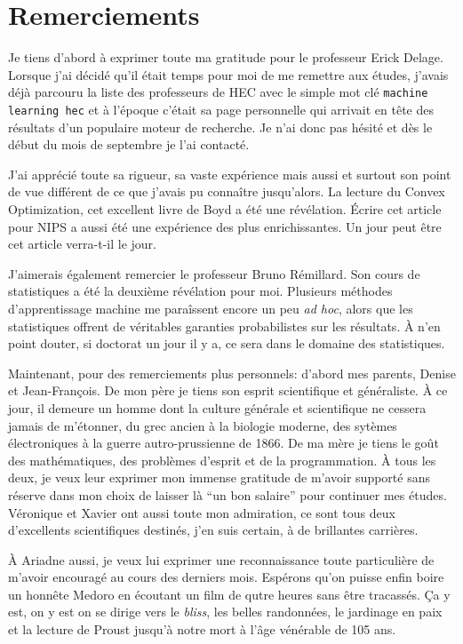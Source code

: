 \section*{Remerciements}

Je tiens d'abord à exprimer toute ma gratitude pour le professeur Erick Delage. Lorsque
j'ai décidé qu'il était temps pour moi de me remettre aux études, j'avais déjà parcouru la
liste des professeurs de HEC avec le simple mot clé \verb+machine learning hec+ et à
l'époque c'était sa page personnelle qui arrivait en tête des résultats d'un populaire
moteur de recherche. Je n'ai donc pas hésité et dès le début du mois de septembre je l'ai
contacté. 

J'ai apprécié toute sa rigueur, sa vaste expérience mais aussi et surtout son point de vue
différent de ce que j'avais pu connaître jusqu'alors. La lecture du Convex Optimization,
cet excellent livre de Boyd a été une révélation. Écrire cet article pour NIPS
a aussi été une expérience des plus enrichissantes. Un jour peut être cet article
verra-t-il le jour. 

J'aimerais également remercier le professeur Bruno Rémillard. Son cours de statistiques a
été la deuxième révélation pour moi. Plusieurs méthodes d'apprentissage machine me
paraîssent encore un peu \textit{ad hoc}, alors que les statistiques offrent de véritables
garanties probabilistes sur les résultats. À n'en point douter, si doctorat un jour il y
a, ce sera dans le domaine des statistiques.

Maintenant, pour des remerciements plus personnels: d'abord mes parents, Denise et
Jean-François. De mon père je tiens son esprit scientifique et généraliste. À ce jour, il
demeure un homme dont la culture générale et scientifique ne cessera jamais de m'étonner,
du grec ancien à la biologie moderne, des sytèmes électroniques à la guerre
autro-prussienne de 1866. De ma mère je tiens le goût des mathématiques, des problèmes
d'esprit et de la programmation. À tous les deux, je veux leur exprimer mon immense
gratitude de m'avoir supporté sans réserve dans mon choix de laisser là ``un bon salaire''
pour continuer mes études. Véronique et Xavier ont aussi toute mon admiration, ce sont
tous deux d'excellents scientifiques destinés, j'en suis certain, à de brillantes
carrières.

À Ariadne aussi, je veux lui exprimer une reconnaissance toute particulière de m'avoir
encouragé au cours des derniers mois. Espérons qu'on puisse enfin boire un honnête Medoro
en écoutant un film de qutre heures sans être tracassés. Ça y est, on y est on se dirige
vers le \textit{bliss}, les belles randonnées, le jardinage en paix et la lecture de
Proust jusqu'à notre mort à l'âge vénérable de 105 ans.


